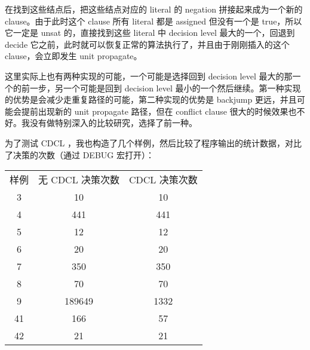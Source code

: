 \documentclass[11pt,a4paper]{ctexart}
\begin{document}
在找到这些结点后，把这些结点对应的 literal 的 negation 拼接起来成为一个新的 clause。由于此时这个 clause 所有 literal 都是 assigned 但没有一个是 true，所以它一定是 unsat 的，直接找到这些 literal 中 decision level 最大的一个，回退到 decide 它之前，此时就可以恢复正常的算法执行了，并且由于刚刚插入的这个 clause，会立即发生 unit propagate。

这里实际上也有两种实现的可能，一个可能是选择回到 decision level 最大的那一个的前一步，另一个可能是回到 decision level 最小的一个然后继续。第一种实现的优势是会减少走重复路径的可能，第二种实现的优势是 backjump 更远，并且可能会提前出现新的 unit propagate 路径，但在 conflict clause 很大的时候效果也不好。我没有做特别深入的比较研究，选择了前一种。

为了测试 CDCL ，我也构造了几个样例，然后比较了程序输出的统计数据，对比了决策的次数（通过 DEBUG 宏打开）：

\begin{center}
\begin{tabular}{|c|c|c|}
    \hline
    样例 & 无 CDCL 决策次数 & CDCL 决策次数 \\
    3 & 10 & 10 \\
    \hline
    4 & 441 & 441 \\
    \hline
    5 & 12 & 12 \\
    \hline
    6 & 20 & 20 \\
    \hline
    7 & 350 & 350 \\
    \hline
    8 & 70 & 70 \\
    \hline
    9 & 189649 & 1332 \\
    \hline
    41 & 166 & 57 \\
    \hline
    42 & 21 & 21 \\
    \hline
\end{tabular}
\end{center}

\printbibliography
\end{document}
